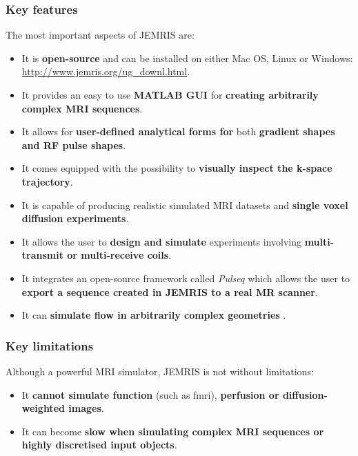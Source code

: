 \hfill

\subsubsection{Key features}
The most important aspects of JEMRIS are:
\begin{itemize}
    
    \item It is \textbf{open-source} and can be installed on either Mac OS, Linux or Windows: \url{http://www.jemris.org/ug_downl.html}.
    
    \item It provides an easy to use \textbf{MATLAB GUI} for \textbf{creating arbitrarily complex MRI sequences}.
    
    \item It allows for \textbf{user-defined analytical forms for} both \textbf{gradient shapes and RF pulse shapes}. 
    
    \item It comes equipped with the possibility to  \textbf{visually inspect the k-space trajectory}.
    
    \item It is capable of producing realistic simulated MRI datasets and  \textbf{single voxel diffusion experiments}.
    
    \item It allows the user to \textbf{design and simulate} experiments involving  \textbf{multi-transmit or multi-receive coils}.
    
    \item It integrates an open-source framework called \textit{Pulseq} \cite{Layton2017} which allows the user to  \textbf{export a sequence created in JEMRIS to a real MR scanner}.
    
    \item It can \textbf{simulate flow in arbitrarily complex geometries} \cite{Fortin2016}.
    
\end{itemize}

\hfill

\subsubsection{Key limitations}
Although a powerful MRI simulator, JEMRIS is not without limitations:
\begin{itemize}
    
    \item It \textbf{cannot simulate function} (such as \ac{fmri}),  \textbf{perfusion or diffusion-weighted images}.
    
    \item It can become  \textbf{slow when simulating complex MRI sequences or highly discretised input objects}. 
    
\end{itemize}

